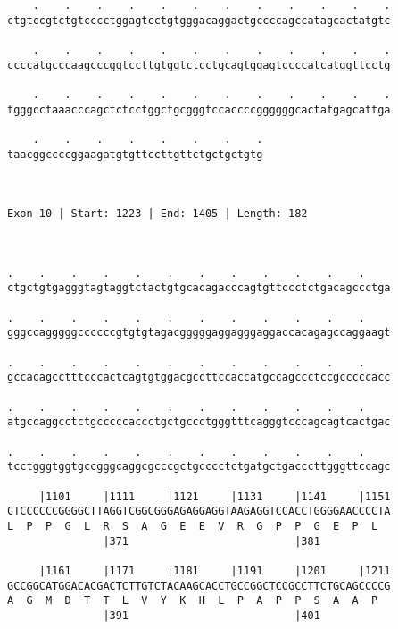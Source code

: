 \documentclass{article}
\begin{document}
\begin{Verbatim}
    .    .    .    .    .    .    .    .    .    .    .    .
ctgtccgtctgtcccctggagtcctgtgggacaggactgccccagccatagcactatgtc
                                                            
    .    .    .    .    .    .    .    .    .    .    .    .
ccccatgcccaagcccggtccttgtggtctcctgcagtggagtccccatcatggttcctg
                                                            
    .    .    .    .    .    .    .    .    .    .    .    .
tgggcctaaacccagctctcctggctgcgggtccaccccggggggcactatgagcattga
                                                            
    .    .    .    .    .    .    .    .
taacggccccggaagatgtgttccttgttctgctgctgtg
                                        
                                        
 
Exon 10 | Start: 1223 | End: 1405 | Length: 182



.    .    .    .    .    .    .    .    .    .    .    .    
ctgctgtgagggtagtaggtctactgtgcacagacccagtgttccctctgacagccctga
                                                            
.    .    .    .    .    .    .    .    .    .    .    .    
gggccagggggccccccgtgtgtagacgggggaggagggaggaccacagagccaggaagt
                                                            
.    .    .    .    .    .    .    .    .    .    .    .    
gccacagcctttcccactcagtgtggacgccttccaccatgccagccctccgcccccacc
                                                            
.    .    .    .    .    .    .    .    .    .    .    .    
atgccaggcctctgcccccaccctgctgccctgggtttcagggtcccagcagtcactgac
                                                            
.    .    .    .    .    .    .    .    .    .    .    .    
tcctgggtggtgccgggcaggcgcccgctgcccctctgatgctgacccttgggttccagc
                                                            
     |1101     |1111     |1121     |1131     |1141     |1151
CTCCCCCCGGGGCTTAGGTCGGCGGGAGAGGAGGTAAGAGGTCCACCTGGGGAACCCCTA
L  P  P  G  L  R  S  A  G  E  E  V  R  G  P  P  G  E  P  L  
               |371                          |381           
  
     |1161     |1171     |1181     |1191     |1201     |1211
GCCGGCATGGACACGACTCTTGTCTACAAGCACCTGCCGGCTCCGCCTTCTGCAGCCCCG
A  G  M  D  T  T  L  V  Y  K  H  L  P  A  P  P  S  A  A  P  
               |391                          |401           
  

\end{Verbatim}
\end{document}
